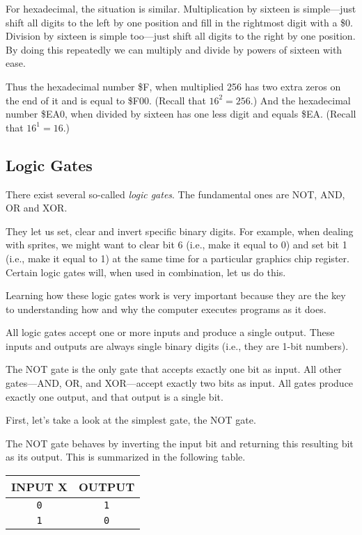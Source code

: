 For hexadecimal, the situation is similar. Multiplication by sixteen is simple---just shift all digits to the left by one position and fill in the rightmost digit with a \$0. Division by sixteen is simple too---just shift all digits to the right by one position. By doing this repeatedly we can multiply and divide by powers of sixteen with ease.

Thus the hexadecimal number \$F, when multiplied 256 has two extra zeros on the end of it and is equal to \$F00. (Recall that $16^{2} = 256$.) And the hexadecimal number \$EA0, when divided by sixteen has one less digit and equals \$EA. (Recall that $16^{1} = 16$.)

\subsection{Logic Gates}

There exist several so-called {\it logic gates}. The fundamental ones are NOT, AND, OR and XOR.

They let us set, clear and invert specific binary digits. For example, when dealing with sprites, we might want to clear bit 6 (i.e., make it equal to 0) and set bit 1 (i.e., make it equal to 1) at the same time for a particular graphics chip register. Certain logic gates will, when used in combination, let us do this.

Learning how these logic gates work is very important because they are the key to understanding how and why the computer executes programs as it does.

All logic gates accept one or more inputs and produce a single output. These inputs and outputs are always single binary digits (i.e., they are 1-bit numbers).

The NOT gate is the only gate that accepts exactly one bit as input. All other gates---AND, OR, and XOR---accept exactly two bits as input. All gates produce exactly one output, and that output is a single bit.

First, let's take a look at the simplest gate, the NOT gate.

The NOT gate behaves by inverting the input bit and returning this resulting bit as its output. This is summarized in the following table.
\begin{center}
	\begin{tabular}{c|c}
	  \hline
		INPUT X & OUTPUT \\ \hline
		\texttt{0} & \texttt{1} \\ \hline
		\texttt{1} & \texttt{0} \\ \hline
	\end{tabular}
\end{center}

